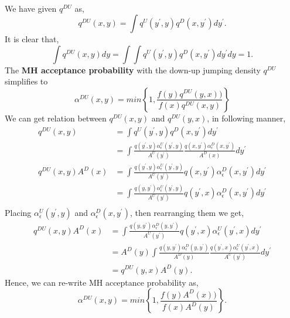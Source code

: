 \documentclass{article}
\begin{document}
\paragraph{}We have given $q^{DU}$ as,
\begin{equation*}
    q^{DU}(x,y)=\int q^U(y^{'},y) q^D(x,y^{'})dy^{'}.
\end{equation*}
It is clear that,
\begin{equation*}
    \int q^{DU}(x,y)dy=\int \int q^U(y^{'},y) q^D(x,y^{'})dy^{'}dy=1.
\end{equation*}
The \textbf{MH acceptance probability} with the down-up jumping density $q^{DU}$ simplifies to
\begin{equation*}
    \alpha^{DU}(x,y)=min\left\{1,\frac{f(y)q^{DU}(y,x))}{f(x)q^{DU}(x,y)}\right\}
\end{equation*}
We can get relation between $q^{DU}(x,y)$ and $q^{DU}(y,x)$, in following manner,
\begin{align*}
    q^{DU}(x,y)&=\int q^U(y^{'},y) q^D(x,y^{'})dy^{'}\\
    &=\int \frac{q(y^{'},y)\alpha_{\epsilon}^U(y^{'},y)}{A^U(y^{'})} \frac{q(x,y^{'})\alpha_{\epsilon}^D(x,y^{'})}{A^D(x)}dy^{'}\\
    q^{DU}(x,y)A^D(x)&=\int \frac{q(y^{'},y)\alpha_{\epsilon}^U(y^{'},y)}{A^U(y^{'})} q(x,y^{'})\alpha_{\epsilon}^D(x,y^{'})dy^{'}\\
    &=\int \frac{q(y,y^{'})\alpha_{\epsilon}^U(y^{'},y)}{A^U(y^{'})} q(y^{'},x)\alpha_{\epsilon}^D(x,y^{'})dy^{'}\\
\end{align*}
Placing $\alpha_{\epsilon}^U(y^{'},y)$ and $\alpha_{\epsilon}^D(x,y^{'})$, then rearranging them we get,
\begin{align*}
    q^{DU}(x,y)A^D(x)&=\int \frac{q(y,y^{'})\alpha_{\epsilon}^D(y,y^{'})}{A^U(y^{'})} q(y^{'},x)\alpha_{\epsilon}^U(y^{'},x)dy^{'}\\
    &=A^D(y)\int \frac{q(y,y^{'})\alpha_{\epsilon}^D(y,y^{'})}{A^D(y)} \frac{q(y^{'},x)\alpha_{\epsilon}^U(y^{'},x)}{A^U(y^{'})}dy^{'}\\
    &=q^{DU}(y,x)A^D(y).
\end{align*}
Hence, we can re-write MH acceptance probability as,
\begin{equation*}
    \alpha^{DU}(x,y)=min\left\{1,\frac{f(y)A^D(x))}{f(x)A^D(y)}\right\}.
\end{equation*}
\end{document}
